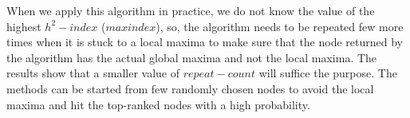 \documentclass[conference]{IEEEtran}
\begin{document}
When we apply this algorithm in practice, we do not know the value of the highest $h^2-index$ ($maxindex$), so, the algorithm needs to be repeated few more times when it is stuck to a local maxima to make sure that the node returned by the algorithm has the actual global maxima and not the local maxima. The results show that a smaller value of $repeat-count$ will suffice the purpose. The methods can be started from few randomly chosen nodes to avoid the local maxima and hit the top-ranked nodes with a high probability.



\end{document}
